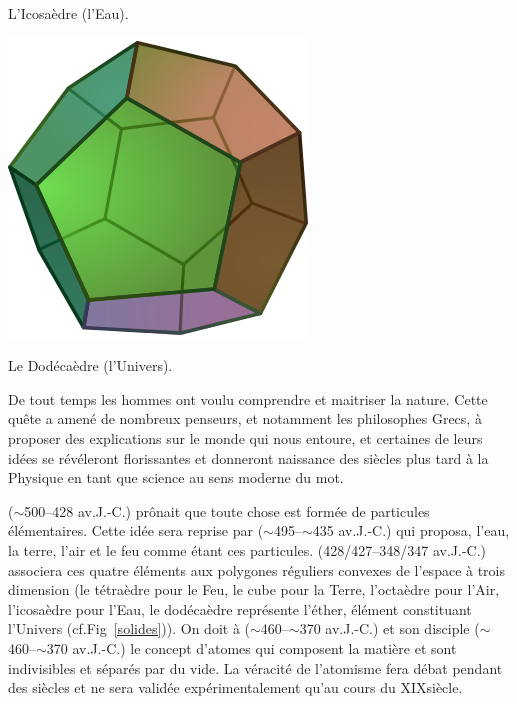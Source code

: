 {\vspace*{-0.25cm}
\begin{center}\normalfont\small {L'Icosaèdre (l'Eau).}\end{center}
\vspace*{-0.25cm}
\includegraphics[width=0.25\marginparwidth]{SM/Dodecahedron.png}
\vspace*{-0.25cm}
\begin{center}\normalfont\small {Le Dodécaèdre (l'Univers).}\end{center}
\vspace*{-0.25cm}
\label{solides}
}
De tout temps les hommes ont voulu comprendre et maitriser la nature. Cette quête a amené de nombreux penseurs, et notamment les philosophes Grecs, à proposer des explications sur le monde qui nous entoure, et certaines de leurs idées se révéleront florissantes et donneront naissance des siècles plus tard à la Physique en tant que science au sens moderne du mot. 

 ($\sim$\num{500}--\num{428} av.J.-C.) prônait que toute chose est formée de particules élémentaires. Cette idée sera reprise par  ($\sim$\num{495}--$\sim$\num{435} av.J.-C.) qui proposa, l'eau, la terre, l'air et le feu comme étant ces particules.  (\num{428}/\num{427}--\num{348}/\num{347} av.J.-C.) associera ces quatre éléments aux polygones réguliers convexes de l'espace à trois dimension (le tétraèdre pour le Feu, le cube pour la Terre, l'octaèdre pour l'Air, l'icosaèdre pour l'Eau, le dodécaèdre représente l'éther, élément constituant l'Univers (cf.Fig~\ref{solides})). On doit à  ($\sim$\num{460}--$\sim$\num{370} av.J.-C.) et son disciple  ($\sim$\num{460}--$\sim$\num{370} av.J.-C.) le concept d'atomes qui composent la matière et sont indivisibles et séparés par du vide. La véracité de l'atomisme fera débat pendant des siècles et ne sera validée expérimentalement qu'au cours du XIX\ieme siècle.

